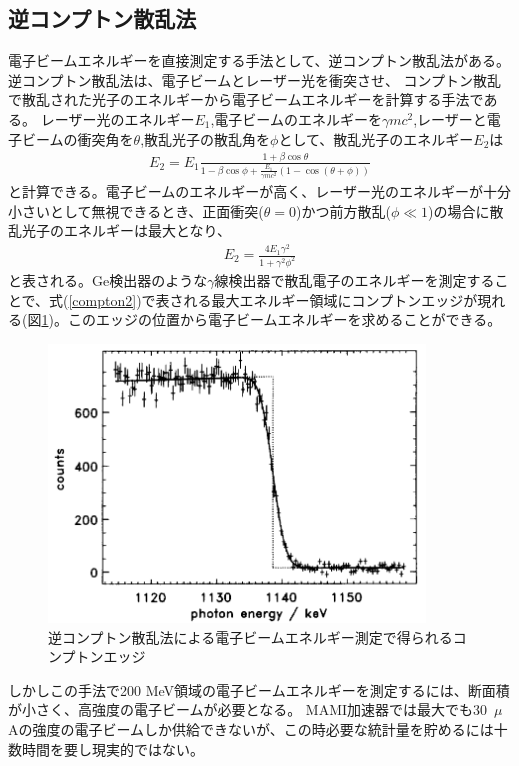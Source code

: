 \documentclass[a4paper,11pt,uplatex]{jsbook}
\begin{document}
\subsection{逆コンプトン散乱法}
電子ビームエネルギーを直接測定する手法として、逆コンプトン散乱法がある。逆コンプトン散乱法は、電子ビームとレーザー光を衝突させ、
コンプトン散乱で散乱された光子のエネルギーから電子ビームエネルギーを計算する手法である。
レーザー光のエネルギー$E_1$,電子ビームのエネルギーを$\gamma mc^2$,レーザーと電子ビームの衝突角を$\theta$,散乱光子の散乱角を$\phi$として、散乱光子のエネルギー$E_2$は
\begin{eqnarray}
  E_2 = E_1\frac{1+\beta\cos{\theta}}{1-\beta\cos{\phi} + \frac{E_1}{\gamma mc^2} (1-\cos{(\theta +\phi)})} \label{compton}
\end{eqnarray}
と計算できる。電子ビームのエネルギーが高く、レーザー光のエネルギーが十分小さいとして無視できるとき、正面衝突($\theta = 0$)かつ前方散乱($\phi \ll 1$)の場合に散乱光子のエネルギーは最大となり、
\begin{eqnarray}
  E_2 = \frac{4E_1\gamma^2}{1 + \gamma^2\phi^2} \label{compton2}
\end{eqnarray}
と表される。Ge検出器のような$\gamma$線検出器で散乱電子のエネルギーを測定することで、式(\ref{compton2})で表される最大エネルギー領域にコンプトンエッジが現れる(図\ref{fig:comp})。このエッジの位置から電子ビームエネルギーを求めることができる。
\begin{figure}[H]
  \centering
  \includegraphics[width=10cm]{image/1-CBS.png}
  \caption[逆コンプトン散乱法]{逆コンプトン散乱法による電子ビームエネルギー測定で得られるコンプトンエッジ\cite{klein1997}}\label{fig:comp}
\end{figure}

しかしこの手法で200 MeV領域の電子ビームエネルギーを測定するには、断面積が小さく、高強度の電子ビームが必要となる。%
MAMI加速器では最大でも30~$\mu$Aの強度の電子ビームしか供給できないが、この時必要な統計量を貯めるには十数時間を要し現実的ではない。
\end{document}
